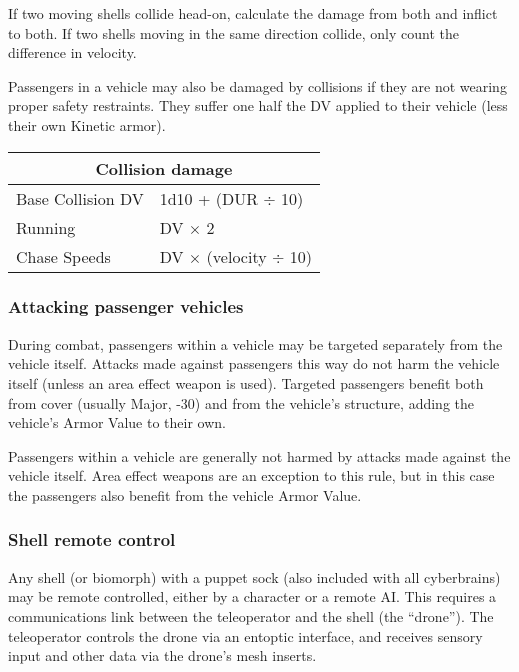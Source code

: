 If two moving shells collide head-on, calculate the damage from both and inflict to both. If two shells moving in the same direction collide, only count the difference in velocity.

Passengers in a vehicle may also be damaged by collisions if they are not wearing proper safety restraints. They suffer one half the DV applied to their vehicle (less their own Kinetic armor).

\begin{table}
\begin{tabular}{|l|l|}
\hline
\multicolumn{2}{|c|}{\textbf{Collision damage}}	\\
\hline
Base Collision DV	& 1d10 + (DUR $\div$ 10)		\\
\hline
Running			& DV $\times$ 2					\\
\hline
Chase Speeds		& DV $\times$ (velocity $\div$ 10)	\\
\hline
\end{tabular}
\label{tab:collision-damage}
\end{table}

\subsubsection{Attacking passenger vehicles}

During combat, passengers within a vehicle may be targeted separately from the vehicle itself. Attacks made against passengers this way do not harm the vehicle itself (unless an area effect weapon is used). Targeted passengers benefit both from cover (usually Major, -30) and from the vehicle’s structure, adding the vehicle’s Armor Value to their own.

Passengers within a vehicle are generally not harmed by attacks made against the vehicle itself. Area effect weapons are an exception to this rule, but in this case the passengers also benefit from the vehicle Armor Value.

\subsubsection{Shell remote control}

Any shell (or biomorph) with a puppet sock (also included with all cyberbrains) may be remote controlled, either by a character or a remote AI. This requires a communications link between the teleoperator and the shell (the ``drone”). The teleoperator controls the drone via an entoptic interface, and receives sensory input and other data via the drone’s mesh inserts.

